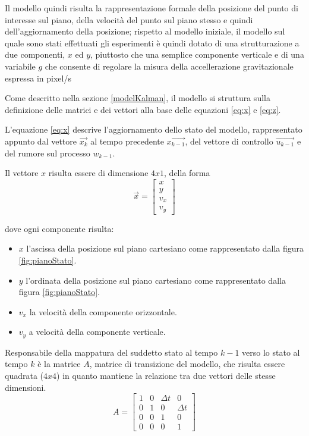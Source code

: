 Il modello quindi risulta la rappresentazione formale della posizione del punto di interesse sul piano, della velocità del punto sul piano stesso e quindi dell'aggiornamento della posizione; rispetto al modello iniziale, il modello sul quale sono stati effettuati gli esperimenti è quindi dotato di una strutturazione a due componenti, $x$ ed $y$, piuttosto che una semplice componente verticale e di una variabile $g$ che consente di regolare la misura della accellerazione gravitazionale espressa in pixel/s

Come descritto nella sezione \ref{modelKalman}, il modello si struttura sulla definizione delle matrici e dei vettori alla base delle equazioni \ref{eq:x} e \ref{eq:z}.

L'equazione \ref{eq:x} descrive l'aggiornamento dello stato del modello, rappresentato appunto dal vettore $\overrightarrow{x_k}$ al tempo precedente $\overrightarrow{x_{k-1}}$, del vettore di controllo $\overrightarrow{u_{k-1}}$ e del rumore sul processo $w_{k-1}$. 

Il vettore $x$ risulta essere di dimensione $4 x 1$, della forma 
\begin{equation}\label{eq:vettoreX}
 \overrightarrow{x}=\begin{bmatrix} x \\ y \\ v_x \\ v_y \end{bmatrix}
\end{equation} 

dove ogni componente risulta:
\begin{itemize}
\item $x$ l'ascissa della posizione sul piano cartesiano come rappresentato dalla figura \ref{fig:pianoStato}.
\item $y$ l'ordinata della posizione sul piano cartesiano come rappresentato dalla figura \ref{fig:pianoStato}.
\item $v_x$ la velocità della componente orizzontale.
\item $v_y$ a velocità della componente verticale.
\end{itemize}

Responsabile della mappatura del suddetto stato al tempo $k-1$ verso lo stato al tempo $k$ è la matrice $A$, matrice di transizione del modello, che risulta essere quadrata ($4 x 4$) in quanto mantiene la relazione tra due vettori delle stesse dimensioni.
\begin{equation}\label{eq:matriceA}
 A = 
\begin{bmatrix}
 1 & 0 & \Delta t & 0 \\
 0 & 1 & 0 & \Delta t \\
 0 & 0 & 1 & 0 \\
 0 & 0 & 0 & 1
\end{bmatrix}
\end{equation} 

